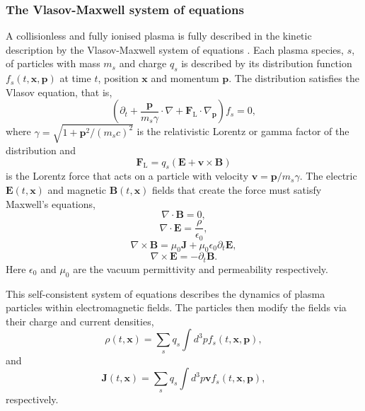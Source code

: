 \subsubsection{The Vlasov-Maxwell system of equations}
A collisionless and fully ionised plasma is fully described in the kinetic description by the Vlasov-Maxwell system of equations \cite{derouillatSmileiCollaborativeOpensource2018}. Each plasma species, $s$, of particles with mass $m_s$ and charge $q_s$ is described by its distribution function $f_s(t,\mathbf{x},\mathbf{p})$ at time $t$, position $\mathbf{x}$ and momentum $\mathbf{p}$. The distribution satisfies the Vlasov equation, that is,
\begin{equation}
	(\partial_t + \frac{\mathbf{p}}{m_s\gamma} \cdot \nabla + \mathbf{F}_\mathrm{L} \cdot \nabla_\mathbf{p})f_s = 0,
\end{equation}
where $\gamma = \sqrt{1+\mathbf{p}^2/(m_sc)^2}$ is the relativistic Lorentz or gamma factor of the distribution and 
\begin{equation}
	\mathbf{F}_\mathrm{L} = q_s(\mathbf{E} + \mathbf{v} \times \mathbf{B})
\end{equation}
is the Lorentz force that acts on a particle with velocity $\mathbf{v}  = \mathbf{p}/m_s\gamma$. The electric $\mathbf{E}(t,\mathbf{x})$ and magnetic $\mathbf{B}(t,\mathbf{x})$ fields that create the force must satisfy Maxwell's equations,
\begin{equation}
	\nabla \cdot \mathbf{B} = 0,
\end{equation}
\begin{equation}
	\nabla \cdot \mathbf{E} = \frac{\rho}{\epsilon_0},
\end{equation}
\begin{equation}
	\nabla \times \mathbf{B} = \mu_0 \mathbf{J} + \mu_0 \epsilon_0 \partial_t \mathbf{E},
\end{equation}
\begin{equation}
	\nabla \times \mathbf{E} =-\partial_t \mathbf{B}.
\end{equation}
Here $\epsilon_0$ and $\mu_0$ are the vacuum permittivity and permeability respectively.

This self-consistent system of equations describes the dynamics of plasma particles within electromagnetic fields. The particles then modify the fields via their charge and current densities,
\begin{equation}
	\rho(t,\mathbf{x}) = \sum_s q_s \int d^3pf_s(t,\mathbf{x},\mathbf{p}),
\end{equation}
and 
\begin{equation}
	\mathbf{J}(t,\mathbf{x}) = \sum_s q_s \int d^3p\mathbf{v}f_s(t,\mathbf{x},\mathbf{p}),
\end{equation}
respectively.

